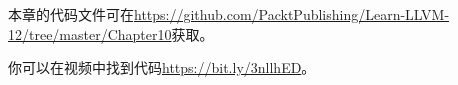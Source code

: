 本章的代码文件可在\url{https://github.com/PacktPublishing/Learn-LLVM-12/tree/master/Chapter10}获取。\par

你可以在视频中找到代码\url{https://bit.ly/3nllhED}。\par